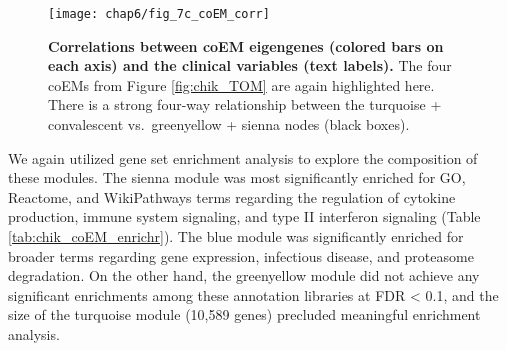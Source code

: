 \begin{table*}[p]
  
\end{table*}

\begin{figure}[htb]
  \centering
  \texttt{[image: chap6/fig\_7c\_coEM\_corr]}
  \caption[Correlations between coexpression modules and clinical variables]{
  \textbf{Correlations between coEM eigengenes (colored bars on each axis) and the clinical variables (text labels).} The four coEMs from Figure \ref{fig:chik_TOM} are again highlighted here. There is a strong four-way relationship between the turquoise + convalescent vs.\ greenyellow + sienna nodes (black boxes). 
  }
  \label{fig:coEM_corr}
\end{figure}

We again utilized gene set enrichment analysis to explore the composition of these modules. The sienna module was most significantly enriched for GO, Reactome, and WikiPathways terms regarding the regulation of cytokine production, immune system signaling, and type II interferon signaling (Table \ref{tab:chik_coEM_enrichr}). The blue module was significantly enriched for broader terms regarding gene expression, infectious disease, and proteasome degradation. On the other hand, the greenyellow module did not achieve any significant enrichments among these annotation libraries at FDR < 0.1, and the size of the turquoise module (10,589 genes) precluded meaningful enrichment analysis.

